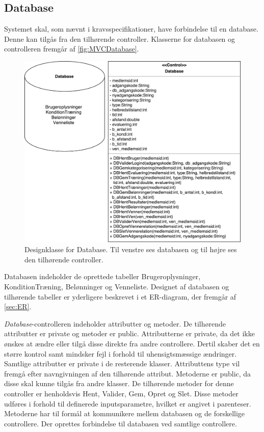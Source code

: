 \subsection*{Database} \label{sec:databaseDesign}
Systemet skal, som nævnt i kravsspecifikationer, have forbindelse til en database. Denne kan tilgås fra den tilhørende controller. Klasserne for databasen og controlleren fremgår af \autoref{fig:MVCDatabase}. 

\begin{figure} [H]
\centering
\includegraphics[width=1\textwidth]{figures/MVC/MVCDatabase}
\caption{Designklasse for Database. Til venstre ses databasen og til højre ses den tilhørende controller.}
\label{fig:MVCDatabase}
\end{figure}

\noindent
Databasen indeholder de oprettede tabeller Brugeroplysninger, KonditionTræning, Belønninger og Venneliste. Designet af databasen og tilhørende tabeller er yderligere beskrevet i et ER-diagram, der fremgår af \autoref{sec:ER}. 

\textit{Database}-controlleren indeholder attributter og metoder. De tilhørende attributter er private og metoder er public. Attributterne er private, da det ikke ønskes at ændre eller tilgå disse direkte fra andre controllere. Dertil skaber det en større kontrol samt mindsker fejl i forhold til uhensigtsmæssige ændringer. Samtlige attributter er private i de resterende klasser. 
Attributtens type vil fremgå efter navngivningen af den tilhørende attribut. Metoderne er public, da disse skal kunne tilgås fra andre klasser. De tilhørende metoder for denne controller er henholdsvis Hent, Valider, Gem, Opret og Slet. Disse metoder udføres i forhold til definerede inputsparametre, hvilket er angivet i parenteser. Metoderne har til formål at kommunikere mellem databasen og de forskellige controllere. Der oprettes forbindelse til databasen ved samtlige controllere. 

